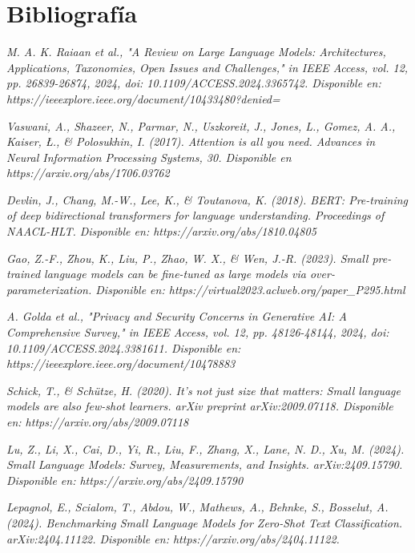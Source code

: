\chapter{Bibliografía}
\label{ch:bibliografia}



\begin{thebibliography}{9}

\textit{M. A. K. Raiaan et al., "A Review on Large Language Models: Architectures, Applications, Taxonomies, Open Issues and Challenges," in IEEE Access, vol. 12, pp. 26839-26874, 2024, doi: 10.1109/ACCESS.2024.3365742. Disponible en: https://ieeexplore.ieee.org/document/10433480?denied=}

\textit{Vaswani, A., Shazeer, N., Parmar, N., Uszkoreit, J., Jones, L., Gomez, A. A., Kaiser, Ł., \& Polosukhin, I. (2017). Attention is all you need. Advances in Neural Information Processing Systems, 30. Disponible en https://arxiv.org/abs/1706.03762}

\textit{Devlin, J., Chang, M.-W., Lee, K., \& Toutanova, K. (2018). BERT: Pre-training of deep bidirectional transformers for language understanding. Proceedings of NAACL-HLT. Disponible en: https://arxiv.org/abs/1810.04805}

\textit{Gao, Z.-F., Zhou, K., Liu, P., Zhao, W. X., \& Wen, J.-R. (2023). Small pre-trained language models can be fine-tuned as large models via over-parameterization. Disponible en: https://virtual2023.aclweb.org/paper_P295.html}

\textit{A. Golda et al., "Privacy and Security Concerns in Generative AI: A Comprehensive Survey," in IEEE Access, vol. 12, pp. 48126-48144, 2024, doi: 10.1109/ACCESS.2024.3381611. Disponible en: https://ieeexplore.ieee.org/document/10478883}

\textit{Schick, T., \& Schütze, H. (2020). It's not just size that matters: Small language models are also few-shot learners. arXiv preprint arXiv:2009.07118. Disponible en: https://arxiv.org/abs/2009.07118}

\textit{Lu, Z., Li, X., Cai, D., Yi, R., Liu, F., Zhang, X., Lane, N. D.,  Xu, M. (2024). Small Language Models: Survey, Measurements, and Insights. arXiv:2409.15790. Disponible en: https://arxiv.org/abs/2409.15790}

\textit{Lepagnol, E., Scialom, T., Abdou, W., Mathews, A., Behnke, S.,  Bosselut, A. (2024). Benchmarking Small Language Models for Zero-Shot Text Classification. arXiv:2404.11122. Disponible en: https://arxiv.org/abs/2404.11122.}


\end{thebibliography}
